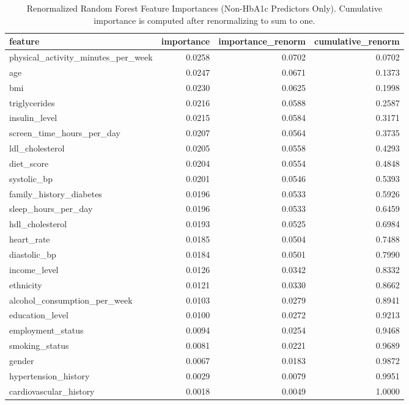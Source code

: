\begin{table}[H]
\begin{center}
\begin{tabular}{lrrr}
\toprule
feature & importance & importance_renorm & cumulative_renorm \\
\midrule
physical\_activity\_minutes\_per\_week & 0.0258 & 0.0702 & 0.0702 \\
age & 0.0247 & 0.0671 & 0.1373 \\
bmi & 0.0230 & 0.0625 & 0.1998 \\
triglycerides & 0.0216 & 0.0588 & 0.2587 \\
insulin\_level & 0.0215 & 0.0584 & 0.3171 \\
screen\_time\_hours\_per\_day & 0.0207 & 0.0564 & 0.3735 \\
ldl\_cholesterol & 0.0205 & 0.0558 & 0.4293 \\
diet\_score & 0.0204 & 0.0554 & 0.4848 \\
systolic\_bp & 0.0201 & 0.0546 & 0.5393 \\
family\_history\_diabetes & 0.0196 & 0.0533 & 0.5926 \\
sleep\_hours\_per\_day & 0.0196 & 0.0533 & 0.6459 \\
hdl\_cholesterol & 0.0193 & 0.0525 & 0.6984 \\
heart\_rate & 0.0185 & 0.0504 & 0.7488 \\
diastolic\_bp & 0.0184 & 0.0501 & 0.7990 \\
income\_level & 0.0126 & 0.0342 & 0.8332 \\
ethnicity & 0.0121 & 0.0330 & 0.8662 \\
alcohol\_consumption\_per\_week & 0.0103 & 0.0279 & 0.8941 \\
education\_level & 0.0100 & 0.0272 & 0.9213 \\
employment\_status & 0.0094 & 0.0254 & 0.9468 \\
smoking\_status & 0.0081 & 0.0221 & 0.9689 \\
gender & 0.0067 & 0.0183 & 0.9872 \\
hypertension\_history & 0.0029 & 0.0079 & 0.9951 \\
cardiovascular\_history & 0.0018 & 0.0049 & 1.0000 \\
\bottomrule
\end{tabular}
\end{center}
\vspace{-5pt}
\caption{Renormalized Random Forest Feature Importances (Non-HbA1c Predictors Only). Cumulative importance is computed after renormalizing to sum to one.}
\label{tab:rf_importance_renorm_non_hba1c}
\end{table}
